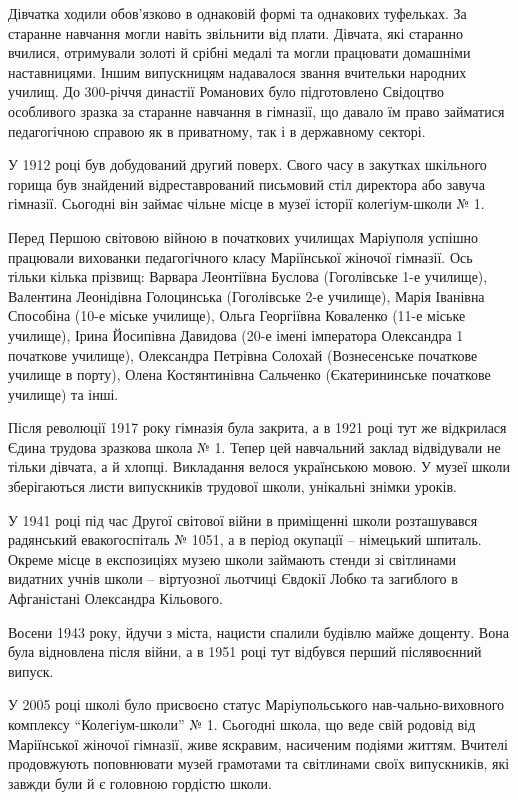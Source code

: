
Дівчатка ходили обов'язково в однаковій формі та однакових туфельках. За
старанне навчання могли навіть звільнити від плати. Дівчата, які старанно
вчилися, отримували золоті й срібні медалі та могли працювати домашніми
наставницями. Іншим випускницям надавалося звання вчительки народних училищ.
До 300-річчя династії Романових було підготовлено Свідоцтво особливого зразка
за старанне навчання в гімназії, що давало їм право займатися педагогічною
справою як в приватному, так і в державному секторі.

У 1912 році був добудований другий поверх. Свого часу в закутках шкільного
горища був знайдений відреставрований письмовий стіл директора або завуча
гімназії. Сьогодні він займає чільне місце в музеї історії колегіум-школи № 1. 


Перед Першою світовою війною в початкових училищах Маріуполя успішно працювали
вихованки педагогічного класу Маріїнської жіночої гімназії. Ось тільки кілька
прізвищ: Варвара Леонтіївна Буслова (Гоголівське 1-е училище), Валентина
Леонідівна  Голоцинська (Гоголівське 2-е училище), Марія Іванівна Способіна
(10-е міське училище), Ольга Георгіївна Коваленко (11-е міське училище), Ірина
Йосипівна Давидова (20-е імені імператора Олександра 1 початкове училище),
Олександра Петрівна Солохай (Вознесенське початкове училище в порту), Олена
Костянтинівна Сальченко (Єкатерининське початкове училище) та інші.

Після революції 1917 року гімназія була закрита, а в 1921 році тут же
відкрилася Єдина трудова зразкова школа № 1. Тепер цей навчальний заклад
відвідували не тільки дівчата, а й хлопці. Викладання велося українською мовою.
У музеї школи зберігаються листи випускників трудової школи, унікальні знімки
уроків.

У 1941 році під час Другої світової війни в приміщенні школи розташувався
радянський евакогоспіталь № 1051, а в період окупації – німецький шпиталь.
Окреме місце в експозиціях музею школи займають стенди зі світлинами видатних
учнів школи – віртуозної льотчиці Євдокії Лобко та загиблого в Афганістані
Олександра Кільового.

Восени 1943 року, йдучи з міста, нацисти спалили будівлю майже дощенту. Вона
була відновлена після війни, а в 1951 році тут відбувся перший післявоєнний
випуск.


У 2005 році школі було присвоєно статус Маріупольського нав\hyp{}чально-виховного
комплексу \enquote{Колегіум-школи} № 1. Сьогодні школа, що веде свій родовід
від Маріїнської жіночої гімназії, живе яскравим, насиченим подіями життям.
Вчителі продовжують поповнювати музей грамотами та світлинами своїх
випускників, які завжди були й є головною гордістю школи.

